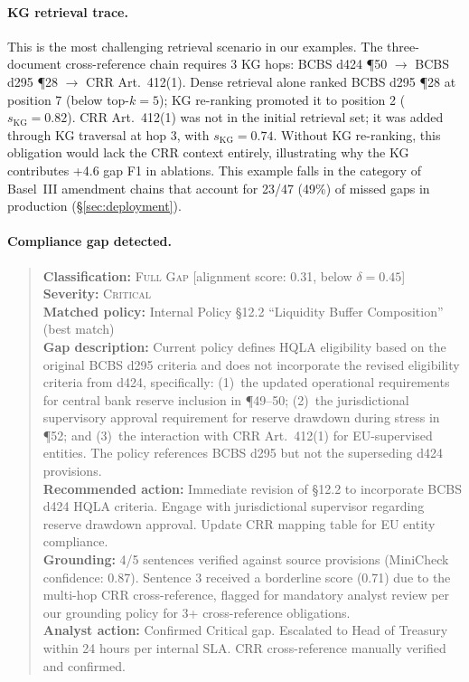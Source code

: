 \documentclass[11pt]{article}
\begin{document}
\paragraph{KG retrieval trace.}  This is the most challenging retrieval scenario in our examples. The three-document cross-reference chain requires 3 KG hops: BCBS d424 \P50 $\to$ BCBS d295 \P28 $\to$ CRR Art.~412(1). Dense retrieval alone ranked BCBS d295 \P28 at position 7 (below top-$k{=}5$); KG re-ranking promoted it to position 2 ($s_{\text{KG}}{=}0.82$). CRR Art.~412(1) was not in the initial retrieval set; it was added through KG traversal at hop 3, with $s_{\text{KG}}{=}0.74$. Without KG re-ranking, this obligation would lack the CRR context entirely, illustrating why the KG contributes +4.6 gap F1 in ablations. This example falls in the category of Basel~III amendment chains that account for 23/47 (49\%) of missed gaps in production (\S\ref{sec:deployment}).

\paragraph{Compliance gap detected.}
\begin{quote}
	\small
	\textbf{Classification:} \textsc{Full Gap} \hfill [alignment score: 0.31, below $\delta{=}0.45$] \\
	\textbf{Severity:} \textsc{Critical} \\
	\textbf{Matched policy:} Internal Policy \S12.2 ``Liquidity Buffer Composition'' (best match) \\
	\textbf{Gap description:} Current policy defines HQLA eligibility based on the original BCBS d295 criteria and does not incorporate the revised eligibility criteria from d424, specifically: (1)~the updated operational requirements for central bank reserve inclusion in \P49--50; (2)~the jurisdictional supervisory approval requirement for reserve drawdown during stress in \P52; and (3)~the interaction with CRR Art.~412(1) for EU-supervised entities. The policy references BCBS d295 but not the superseding d424 provisions. \\
	\textbf{Recommended action:} Immediate revision of \S12.2 to incorporate BCBS d424 HQLA criteria. Engage with jurisdictional supervisor regarding reserve drawdown approval. Update CRR mapping table for EU entity compliance. \\
	\textbf{Grounding:} 4/5 sentences verified against source provisions (MiniCheck confidence: 0.87). Sentence 3 received a borderline score (0.71) due to the multi-hop CRR cross-reference, flagged for mandatory analyst review per our grounding policy for 3+ cross-reference obligations. \\
	\textbf{Analyst action:} Confirmed Critical gap. Escalated to Head of Treasury within 24 hours per internal SLA. CRR cross-reference manually verified and confirmed.
\end{quote}
\end{document}
